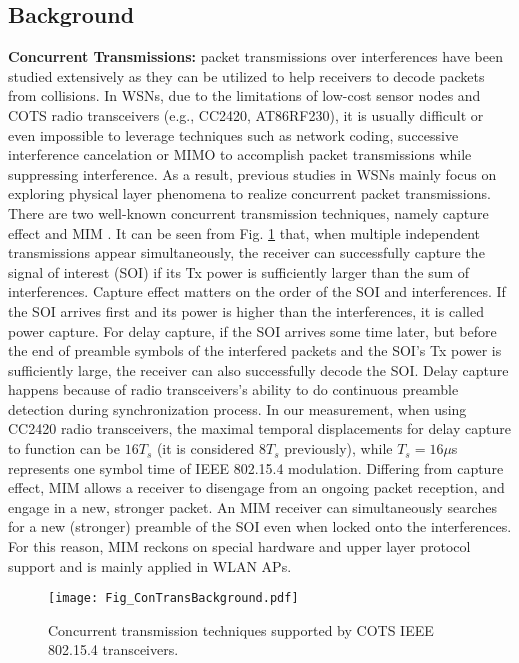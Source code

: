 \documentclass[conference]{IEEEtran}
\begin{document}
\subsection{Background}
\textbf{Concurrent Transmissions:} packet transmissions over interferences have been studied extensively as they can be utilized to help receivers to decode packets from collisions.
In WSNs, due to the limitations of low-cost sensor nodes and COTS radio transceivers (e.g., CC2420, AT86RF230), it is usually difficult or even impossible to leverage techniques such as network coding, successive interference cancelation or MIMO to accomplish packet transmissions while suppressing interference.
As a result, previous studies in WSNs mainly focus on exploring physical layer phenomena to realize concurrent packet transmissions.\\
\indent There are two well-known concurrent transmission techniques, namely capture effect \cite{leentvaar1976captureeffect} and MIM \cite{santhapuri2008message}.
It can be seen from Fig. \ref{Fig_ConCurrentOverview} that, when multiple independent transmissions appear simultaneously, the receiver can successfully capture the signal of interest (SOI) if its Tx power is sufficiently larger than the sum of interferences.
Capture effect matters on the order of the SOI and interferences.
If the SOI arrives first and its power is higher than the interferences, it is called power capture.
For delay capture, if the SOI arrives some time later, but before the end of preamble symbols of the interfered packets and the SOI's Tx power is sufficiently large, the receiver can also successfully decode the SOI.
Delay capture happens because of radio transceivers's ability to do continuous preamble detection during synchronization process.
In our measurement, when using CC2420 radio transceivers, the maximal temporal displacements for delay capture to function can be $16T_s$ (it is considered $8T_s$ previously), while $T_s=16\mu$s represents one symbol time of IEEE 802.15.4 modulation.
Differing from capture effect, MIM allows a receiver to disengage from an ongoing packet reception, and engage in a new, stronger packet.
An MIM receiver can simultaneously searches for a new (stronger) preamble of the SOI even when locked onto the interferences.
For this reason, MIM reckons on special hardware and upper layer protocol support and is mainly applied in WLAN APs.\\
\begin{figure}
\centering
\texttt{[image: Fig\_ConTransBackground.pdf]}
\caption{Concurrent transmission techniques supported by COTS IEEE 802.15.4 transceivers.}
\label{Fig_ConCurrentOverview}
\end{figure}
\end{document}
